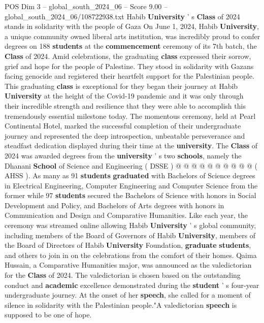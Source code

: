 \begin{textsample}{POS Dim 3 – global\_south\_2024\_06 – Score 9.00 – global\_south\_2024\_06/108722938.txt}  \label{ex:f3_pos_344}
Habib \textbf{University} ' s \textbf{Class} of 2024 stands in solidarity with the people of Gaza On June 1, 2024, Habib \textbf{University}, a unique community owned liberal arts institution, was incredibly proud to confer degrees on 188 \textbf{students} at the \textbf{commencement} ceremony of its 7th batch, the \textbf{Class} of 2024.
Amid celebrations, the graduating \textbf{class} expressed their sorrow, grief and hope for the people of Palestine.
They stood in solidarity with Gazans facing genocide and registered their heartfelt support for the Palestinian people.
This graduating \textbf{class} is exceptional for they began their journey at Habib \textbf{University} at the height of the Covid-19 pandemic and it was only through their incredible strength and resilience that they were able to accomplish this tremendously essential milestone today.
The momentous ceremony, held at Pearl Continental Hotel, marked the successful completion of their undergraduate journey and represented the deep introspection, unbeatable perseverance and steadfast dedication displayed during their time at the \textbf{university}.
The \textbf{Class} of 2024 was awarded degrees from the \textbf{university} ' s two \textbf{schools}, namely the Dhanani \textbf{School} of Science and Engineering ( DSSE ) @ @ @ @ @ @ @ @ @ @ ( AHSS ).
As many as 91 \textbf{students} \textbf{graduated} with Bachelors of Science degrees in Electrical Engineering, Computer Engineering and Computer Science from the former while 97 \textbf{students} secured the Bachelors of Science with honors in Social Development and Policy, and Bachelors of Arts degrees with honors in Communication and Design and Comparative Humanities.
Like each year, the ceremony was streamed online allowing Habib \textbf{University} ' s global community, including members of the Board of Governors of Habib \textbf{University}, members of the Board of Directors of Habib \textbf{University} Foundation, \textbf{graduate} \textbf{students}, and others to join in on the celebrations from the comfort of their homes.
Qaima Hussain, a Comparative Humanities major, was announced as the valedictorian for the \textbf{Class} of 2024.
The valedictorian is chosen based on the outstanding conduct and \textbf{academic} excellence demonstrated during the \textbf{student} ' s four-year undergraduate journey.
At the onset of her \textbf{speech}, she called for a moment of silence in solidarity with the Palestinian people."A valedictorian \textbf{speech} is supposed to be one of hope.

\end{textsample}
